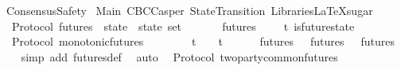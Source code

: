 %
\begin{isabellebody}%
%
%
\isadelimdocument
%
\endisadelimdocument
%
\isatagdocument
%
\isamarkuptrue%
%
\endisatagdocument
{\isafolddocument}%
%
\isadelimdocument
%
\endisadelimdocument
%
\isadelimtheory
%
\endisadelimtheory
%
\isatagtheory
{}\isamarkupfalse%
\ ConsensusSafety\isanewline
\isanewline
{}\ Main\ CBCCasper\ StateTransition\ {\isachardoublequoteopen}Libraries{\isacharslash}LaTeXsugar{\isachardoublequoteclose}\isanewline
\isanewline
{}%
\endisatagtheory
{\isafoldtheory}%
%
\isadelimtheory
\isanewline
%
\endisadelimtheory
\isanewline
\isanewline
\isanewline
\isanewline
\isanewline
{}\isamarkupfalse%
\ {\isacharparenleft}\ Protocol{\isacharparenright}\ futures\ {\isacharcolon}{\isacharcolon}\ {\isachardoublequoteopen}state\ {\isasymRightarrow}\ state\ set{\isachardoublequoteclose}\isanewline
\ \ \isanewline
\ \ \ \ {\isachardoublequoteopen}futures\ {\isasymsigma}\ {\isacharequal}\ {\isacharbraceleft}{\isasymsigma}{\isacharprime}\ {\isasymin}\ {\isasymSigma}t{\isachardot}\ is{\isacharunderscore}future{\isacharunderscore}state\ {\isacharparenleft}{\isasymsigma}{\isacharcomma}\ {\isasymsigma}{\isacharprime}{\isacharparenright}{\isacharbraceright}{\isachardoublequoteclose}\isanewline
\isanewline
\isanewline
{}\isamarkupfalse%
\ {\isacharparenleft}\ Protocol{\isacharparenright}\ monotonic{\isacharunderscore}futures\ {\isacharcolon}\isanewline
\ \ {\isachardoublequoteopen}{\isasymforall}\ {\isasymsigma}{\isacharprime}\ {\isasymsigma}{\isachardot}\ {\isasymsigma}{\isacharprime}\ {\isasymin}\ {\isasymSigma}t\ {\isasymand}\ {\isasymsigma}\ {\isasymin}\ {\isasymSigma}t\isanewline
\ \ \ {\isasymlongrightarrow}\ {\isasymsigma}{\isacharprime}\ {\isasymin}\ futures\ {\isasymsigma}\ {\isasymlongleftrightarrow}\ futures\ {\isasymsigma}{\isacharprime}\ {\isasymsubseteq}\ futures\ {\isasymsigma}{\isachardoublequoteclose}\isanewline
%
\isadelimproof
\ \ %
\endisadelimproof
%
\isatagproof
{}\isamarkupfalse%
\ {\isacharparenleft}simp\ add{\isacharcolon}\ futures{\isacharunderscore}def{\isacharparenright}\ \isamarkupfalse%
\ auto%
\endisatagproof
{\isafoldproof}%
%
\isadelimproof
\isanewline
%
\endisadelimproof
\isanewline
\isanewline
{}\isamarkupfalse%
\ {\isacharparenleft}\ Protocol{\isacharparenright}\ two{\isacharunderscore}party{\isacharunderscore}common{\isacharunderscore}futures\ {\isacharcolon}\isanewline

\end{isabellebody}
